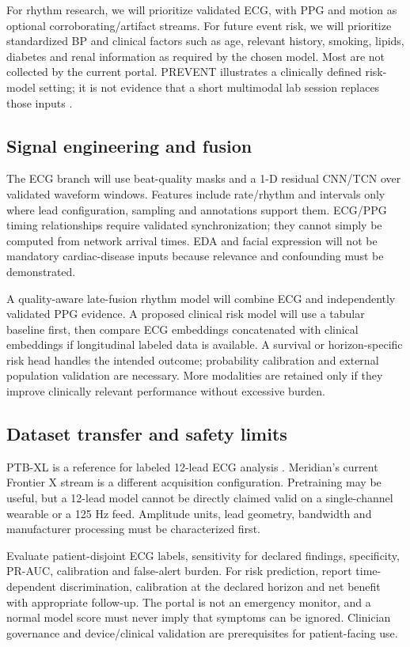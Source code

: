 \documentclass[11pt,a4paper]{article}
\begin{document}
For rhythm research, we will prioritize validated ECG, with PPG and motion as optional corroborating/artifact streams. For future event risk, we will prioritize standardized BP and clinical factors such as age, relevant history, smoking, lipids, diabetes and renal information as required by the chosen model. Most are not collected by the current portal. PREVENT illustrates a clinically defined risk-model setting; it is not evidence that a short multimodal lab session replaces those inputs \cite{prevent}.

\subsection{Signal engineering and fusion}
The ECG branch will use beat-quality masks and a 1-D residual CNN/TCN over validated waveform windows. Features include rate/rhythm and intervals only where lead configuration, sampling and annotations support them. ECG/PPG timing relationships require validated synchronization; they cannot simply be computed from network arrival times. EDA and facial expression will not be mandatory cardiac-disease inputs because relevance and confounding must be demonstrated.

A quality-aware late-fusion rhythm model will combine ECG and independently validated PPG evidence. A proposed clinical risk model will use a tabular baseline first, then compare ECG embeddings concatenated with clinical embeddings if longitudinal labeled data is available. A survival or horizon-specific risk head handles the intended outcome; probability calibration and external population validation are necessary. More modalities are retained only if they improve clinically relevant performance without excessive burden.

\subsection{Dataset transfer and safety limits}
PTB-XL is a reference for labeled 12-lead ECG analysis \cite{ptbxl}. Meridian's current Frontier X stream is a different acquisition configuration. Pretraining may be useful, but a 12-lead model cannot be directly claimed valid on a single-channel wearable or a 125 Hz feed. Amplitude units, lead geometry, bandwidth and manufacturer processing must be characterized first.

Evaluate patient-disjoint ECG labels, sensitivity for declared findings, specificity, PR-AUC, calibration and false-alert burden. For risk prediction, report time-dependent discrimination, calibration at the declared horizon and net benefit with appropriate follow-up. The portal is not an emergency monitor, and a normal model score must never imply that symptoms can be ignored. Clinician governance and device/clinical validation are prerequisites for patient-facing use.
\end{document}
